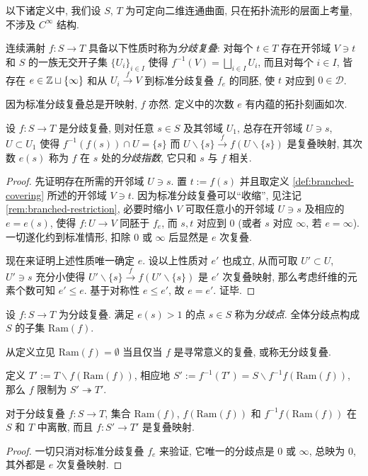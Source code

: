 以下诸定义中, 我们设 $S$, $T$ 为可定向二维连通曲面, 只在拓扑流形的层面上考量, 不涉及 $C^\infty$ 结构.
\begin{definition}\label{def:branched-covering}
	连续满射 $f: S \to T$ 具备以下性质时称为\emph{分歧复叠}: 对每个 $t \in T$ 存在开邻域 $V \ni t$ 和 $S$ 的一族无交开子集 $\{U_i \}_{i \in I}$ 使得 $f^{-1}(V) = \bigsqcup_{i \in I} U_i$, 而且对每个 $i \in I$, 皆存在 $e \in \mathbb{Z} \sqcup \{\infty\}$ 和从 $U_i \xrightarrow{f} V$ 到标准分歧复叠 $f_e$ 的同胚, 使 $t$ 对应到 $0 \in \mathcal{D}$.
\end{definition}

因为标准分歧复叠总是开映射, $f$ 亦然. 定义中的次数 $e$ 有内蕴的拓扑刻画如次.

\begin{definition-theorem}\label{def-prop:ramification-index}
	设 $f: S \to T$ 是分歧复叠, 则对任意 $s \in S$ 及其邻域 $U_1$, 总存在开邻域 $U \ni s$, $U \subset U_1$ 使得 $f^{-1}(f(s)) \cap U = \{s\}$ 而 $U \smallsetminus \{s\} \xrightarrow{f} f(U \smallsetminus \{s\})$ 是复叠映射, 其次数 $e(s)$ 称为 $f$ 在 $s$ 处的\emph{分歧指数}, 它只和 $s$ 与 $f$ 相关.
\end{definition-theorem}
\begin{proof}
	先证明存在所需的开邻域 $U \ni s$. 置 $t := f(s)$ 并且取定义 \ref{def:branched-covering} 所述的开邻域 $V \ni t$. 因为标准分歧复叠可以``收缩'', 见注记 \ref{rem:branched-restriction}, 必要时缩小 $V$ 可取任意小的开邻域 $U \ni s$ 及相应的 $e = e(s)$, 使得 $f: U \to V$ 同胚于 $f_e$, 而 $s, t$ 对应到 $0$ (或者 $s$ 对应 $\infty$, 若 $e = \infty$). 一切遂化约到标准情形, 扣除 $0$ 或 $\infty$ 后显然是 $e$ 次复叠.

	现在来证明上述性质唯一确定 $e$. 设以上性质对 $e'$ 也成立, 从而可取 $U' \subset U$, $U' \ni s$ 充分小使得 $U' \smallsetminus \{s\} \xrightarrow{f} f(U' \smallsetminus \{s\})$ 是 $e'$ 次复叠映射, 那么考虑纤维的元素个数可知 $e' \leq e$. 基于对称性 $e \leq e'$, 故 $e = e'$. 证毕.
\end{proof}

\begin{definition}\label{def:Ram}
	设 $f: S \to T$ 为分歧复叠. 满足 $e(s) > 1$ 的点 $s \in S$ 称为\emph{分歧点}. 全体分歧点构成 $S$ 的子集 $\mathrm{Ram}(f)$.
\end{definition}

从定义立见 $\mathrm{Ram}(f) = \emptyset$ 当且仅当 $f$ 是寻常意义的复叠, 或称无分歧复叠.

定义 $T' := T \smallsetminus f(\mathrm{Ram}(f))$, 相应地 $S' := f^{-1}(T') = S \smallsetminus f^{-1}f(\mathrm{Ram}(f))$, 那么 $f$ 限制为 $S' \twoheadrightarrow T'$.
\begin{proposition}\label{prop:ramified-covering-unramified}
	对于分歧复叠 $f: S \to T$, 集合 $\mathrm{Ram}(f)$, $f(\mathrm{Ram}(f))$ 和 $f^{-1}f(\mathrm{Ram}(f))$ 在 $S$ 和 $T$ 中离散, 而且 $f: S' \to T'$ 是复叠映射.
\end{proposition}
\begin{proof}
	一切只消对标准分歧复叠 $f_e$ 来验证, 它唯一的分歧点是 $0$ 或 $\infty$, 总映为 $0$, 其外都是 $e$ 次复叠映射.
\end{proof}


